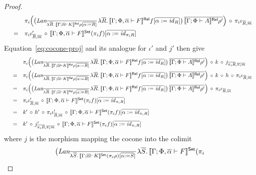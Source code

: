 \documentclass{lmcs}
\theoremstyle{plain}\newtheorem{satz}[thm]{Satz}
\renewcommand{\id}{\mathit{id}}
\begin{document}
{\begin{proof}
\[\begin{array}{lll}
 & & \pi_i \Big( \big(\textit{Lan}_{\ol{\lambda \ol{R}.\,\relsem{\Gamma;
      \ol\alpha \vdash K}\rho[\ol{\alpha := R}]}}\, \lambda
\ol{R}.\,\relsem{\Gamma; \Phi, \ol\alpha \vdash F}f[\ol{\alpha :=
    \id_R}]\big)\, \ol{\relsem{\Gamma; \Phi \vdash A}\rho'} \Big)
\,\circ\, \pi_i \iota_{\ol{R}, \ol{m}} \\[2ex]
& = & \pi_i \iota'_{\ol{R},
  \ol{m}} \,\circ\, \setsem{\Gamma; \Phi, \ol\alpha \vdash F} (\pi_i
f)[\ol{\alpha := \id_{\pi_i R}}]
\end{array}\]
Equation~\ref{eq:cocone-proj} and its analogue for
  $\iota'$ and $j'$ then give 
\[\begin{array}{lll}
& & \pi_i \Big( \big(\textit{Lan}_{\ol{\lambda
    \ol{R}.\,\relsem{\Gamma; \ol\alpha \vdash K}\rho[\ol{\alpha :=
        R}]}}\, \lambda \ol{R}.\,\relsem{\Gamma; \Phi, \ol\alpha
  \vdash F}f[\ol{\alpha := \id_R}]\big)\, \ol{\relsem{\Gamma; \Phi
    \vdash A}\rho'} \Big) \,\circ \, k \,\circ\, j_{\ol{\pi_i R},
  \ol{\pi_i m}} \\[2ex]
&  = & \pi_i \Big( \big(\textit{Lan}_{\ol{\lambda \ol{R}.\,\relsem{\Gamma;
      \ol\alpha \vdash K}\rho[\ol{\alpha := R}]}}\, \lambda
\ol{R}.\,\relsem{\Gamma; \Phi, \ol\alpha \vdash F}f[\ol{\alpha :=
    \id_R}]\big)\, \ol{\relsem{\Gamma; \Phi \vdash A}\rho'} \Big)
\,\circ\, k \,\circ\, h \,\circ \,\pi_i \iota_{\ol{R}, \ol{m}} \\[2ex]
& = & \pi_i \Big( \big(\textit{Lan}_{\ol{\lambda \ol{R}.\,\relsem{\Gamma;
      \ol\alpha \vdash K}\rho[\ol{\alpha := R}]}}\, \lambda
\ol{R}.\,\relsem{\Gamma; \Phi, \ol\alpha \vdash F}f[\ol{\alpha :=
    \id_R}]\big)\, \ol{\relsem{\Gamma; \Phi \vdash A}\rho'} \Big)
\,\circ\, \pi_i \iota_{\ol{R}, \ol{m}} \\[2ex]
& = & \pi_i \iota'_{\ol{R},
  \ol{m}} \,\circ\, \setsem{\Gamma; \Phi, \ol\alpha \vdash F} (\pi_i
f)[\ol{\alpha := \id_{\pi_i R}}]\\[2ex]
& = & k' \, \circ \, h'\,\circ\,\pi_i \iota'_{\ol{R},
  \ol{m}} \,\circ\, \setsem{\Gamma; \Phi, \ol\alpha \vdash F} (\pi_i
f)[\ol{\alpha := \id_{\pi_i R}}]\\[2ex]
& = & k' \,\circ \, j'_{\ol{\pi_i R}, \ol{\pi_i m}} \,\circ\, \setsem{\Gamma; \Phi,
      \ol\alpha \vdash F} (\pi_i f)[\ol{\alpha := \id_{\pi_i R}}]
\end{array}\]
where $j$ is the morphism mapping the cocone into the colimit
\[
\big(\textit{Lan}_{\overline{\lambda \overline{S}.\,\llbracket{\Gamma; \overline{\alpha}
      \vdash K}\rrbracket^{\mathsf{Set}}(\pi_i \rho)[\overline{\alpha := S}]}}\, \lambda
\overline{S}.\,\llbracket{\Gamma; \Phi, \overline{\alpha} \vdash F}\rrbracket^{\mathsf{Set}}(\pi_i
\]
\end{proof}}
\end{document}

